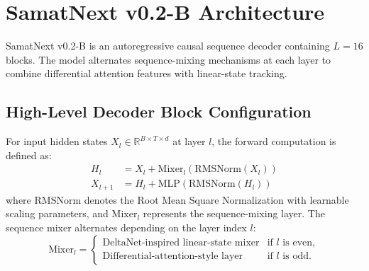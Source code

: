 \documentclass[11pt,a4paper]{article}
\begin{document}
\section{SamatNext v0.2-B Architecture}
SamatNext v0.2-B is an autoregressive causal sequence decoder containing $L=16$ blocks. The model alternates sequence-mixing mechanisms at each layer to combine differential attention features with linear-state tracking.

\subsection{High-Level Decoder Block Configuration}
For input hidden states $X_l \in \mathbb{R}^{B \times T \times d}$ at layer $l$, the forward computation is defined as:
\begin{align}
    H_l &= X_l + \text{Mixer}_l\left(\text{RMSNorm}(X_l)\right) \\
    X_{l+1} &= H_l + \text{MLP}\left(\text{RMSNorm}(H_l)\right)
\end{align}
where $\text{RMSNorm}$ denotes the Root Mean Square Normalization \cite{zhang2019root}
with learnable scaling parameters, and $\text{Mixer}_l$ represents the sequence-mixing layer. The sequence mixer alternates depending on the layer index $l$:
\begin{equation}
\label{eq:mixer_alternation}
    \text{Mixer}_l = \begin{cases}
        \text{DeltaNet-inspired linear-state mixer} & \text{if } l \text{ is even}, \\
        \text{Differential-attention-style layer} & \text{if } l \text{ is odd}.
    \end{cases}
\end{equation}
\end{document}
